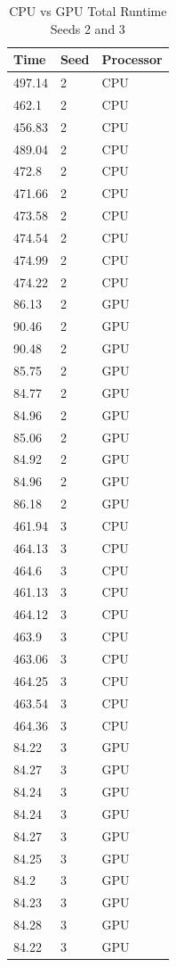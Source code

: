 \documentclass{acm_proc_article-sp}
\begin{document}
\begin{table}
\caption{CPU vs GPU Total Runtime Seeds 2 and 3}
\centering
 \begin{tabular}{ | l | l | l |}
    \hline
    Time & Seed & Processor \\ \hline
    497.14 & 2 & CPU \\ \hline
    462.1 & 2 & CPU \\ \hline
    456.83 & 2 & CPU \\ \hline
    489.04 & 2 & CPU \\ \hline
    472.8 & 2 & CPU \\ \hline
    471.66 & 2 & CPU \\ \hline
    473.58 & 2 & CPU \\ \hline
    474.54 & 2 & CPU \\ \hline
    474.99 & 2 & CPU \\ \hline
    474.22 & 2 & CPU \\ \hline
    86.13 & 2 & GPU \\ \hline
    90.46 & 2 & GPU \\ \hline
    90.48 & 2 & GPU \\ \hline
    85.75 & 2 & GPU \\ \hline
    84.77 & 2 & GPU \\ \hline
    84.96 & 2 & GPU \\ \hline
    85.06 & 2 & GPU \\ \hline
    84.92 & 2 & GPU \\ \hline
    84.96 & 2 & GPU \\ \hline
    86.18 & 2 & GPU \\ \hline
    461.94 & 3 & CPU \\ \hline
    464.13 & 3 & CPU \\ \hline
    464.6 & 3 & CPU \\ \hline
    461.13 & 3 & CPU \\ \hline
    464.12 & 3 & CPU \\ \hline
    463.9 & 3 & CPU \\ \hline
    463.06 & 3 & CPU \\ \hline
    464.25 & 3 & CPU \\ \hline
    463.54 & 3 & CPU \\ \hline
    464.36 & 3 & CPU \\ \hline
    84.22 & 3 & GPU \\ \hline
    84.27 & 3 & GPU \\ \hline
    84.24 & 3 & GPU \\ \hline
    84.24 & 3 & GPU \\ \hline
    84.27 & 3 & GPU \\ \hline
    84.25 & 3 & GPU \\ \hline
    84.2 & 3 & GPU \\ \hline
    84.23 & 3 & GPU \\ \hline
    84.28 & 3 & GPU \\ \hline
    84.22 & 3 & GPU \\ \hline
    \end{tabular}
\label{table:CPU vs GPU total runtime part 2}
\end{table}
\end{document}
